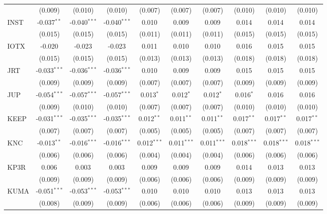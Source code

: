 \begin{table}[!htbp]
\begin{tabular}{@{\extracolsep{5pt}}lccccccccc}
  & (0.009) & (0.010) & (0.010) & (0.007) & (0.007) & (0.007) & (0.010) & (0.010) & (0.010) \\
 INST & -0.037$^{**}$ & -0.040$^{***}$ & -0.040$^{***}$ & 0.010$^{}$ & 0.009$^{}$ & 0.009$^{}$ & 0.014$^{}$ & 0.014$^{}$ & 0.014$^{}$ \\
  & (0.015) & (0.015) & (0.015) & (0.011) & (0.011) & (0.011) & (0.015) & (0.015) & (0.015) \\
 IOTX & -0.020$^{}$ & -0.023$^{}$ & -0.023$^{}$ & 0.011$^{}$ & 0.010$^{}$ & 0.010$^{}$ & 0.016$^{}$ & 0.015$^{}$ & 0.015$^{}$ \\
  & (0.015) & (0.015) & (0.015) & (0.013) & (0.013) & (0.013) & (0.018) & (0.018) & (0.018) \\
 JRT & -0.033$^{***}$ & -0.036$^{***}$ & -0.036$^{***}$ & 0.010$^{}$ & 0.009$^{}$ & 0.009$^{}$ & 0.015$^{}$ & 0.015$^{}$ & 0.015$^{}$ \\
  & (0.009) & (0.009) & (0.009) & (0.007) & (0.007) & (0.007) & (0.009) & (0.009) & (0.009) \\
 JUP & -0.054$^{***}$ & -0.057$^{***}$ & -0.057$^{***}$ & 0.013$^{*}$ & 0.012$^{*}$ & 0.012$^{*}$ & 0.016$^{*}$ & 0.016$^{}$ & 0.016$^{}$ \\
  & (0.009) & (0.010) & (0.010) & (0.007) & (0.007) & (0.007) & (0.010) & (0.010) & (0.010) \\
 KEEP & -0.031$^{***}$ & -0.035$^{***}$ & -0.035$^{***}$ & 0.012$^{**}$ & 0.011$^{**}$ & 0.011$^{**}$ & 0.017$^{**}$ & 0.017$^{**}$ & 0.017$^{**}$ \\
  & (0.007) & (0.007) & (0.007) & (0.005) & (0.005) & (0.005) & (0.007) & (0.007) & (0.007) \\
 KNC & -0.013$^{**}$ & -0.016$^{***}$ & -0.016$^{***}$ & 0.012$^{***}$ & 0.011$^{***}$ & 0.011$^{***}$ & 0.018$^{***}$ & 0.018$^{***}$ & 0.018$^{***}$ \\
  & (0.006) & (0.006) & (0.006) & (0.004) & (0.004) & (0.004) & (0.006) & (0.006) & (0.006) \\
 KP3R & 0.006$^{}$ & 0.003$^{}$ & 0.003$^{}$ & 0.009$^{}$ & 0.009$^{}$ & 0.009$^{}$ & 0.014$^{}$ & 0.013$^{}$ & 0.013$^{}$ \\
  & (0.009) & (0.009) & (0.009) & (0.006) & (0.006) & (0.006) & (0.009) & (0.009) & (0.009) \\
 KUMA & -0.051$^{***}$ & -0.053$^{***}$ & -0.053$^{***}$ & 0.010$^{}$ & 0.010$^{}$ & 0.010$^{}$ & 0.013$^{}$ & 0.013$^{}$ & 0.013$^{}$ \\
  & (0.008) & (0.009) & (0.009) & (0.006) & (0.006) & (0.006) & (0.009) & (0.009) & (0.009) \\

\end{tabular}
\end{table}
